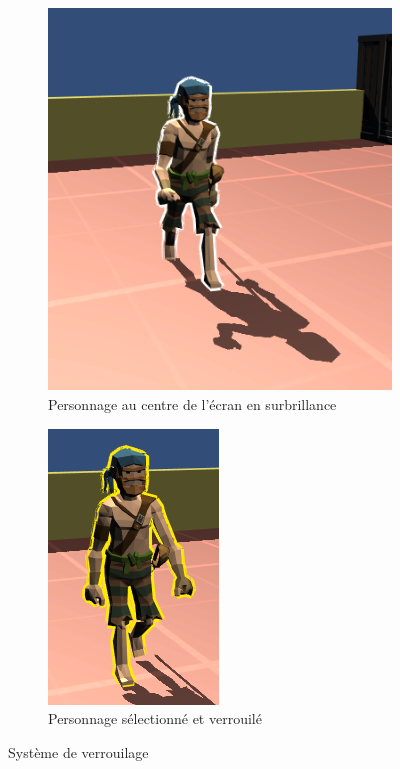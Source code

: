 \documentclass[french, 12pt]{article}
\begin{document}
            \begin{figure}[hbt!]
                \centering
                \begin{subfigure}[b]{0.3\textwidth}
                    \includegraphics[scale=0.5]{white_outline.png} 
                    \caption{Personnage au centre de l'écran en surbrillance}
                \end{subfigure}
                \hspace{150pt}
                \begin{subfigure}[b]{0.3\textwidth}
                    \includegraphics[scale=0.8]{yellow_outline.png} 
                    \caption{Personnage sélectionné et verrouilé}
                \end{subfigure}
                \caption{Système de verrouilage}
            \end{figure}
\end{document}
